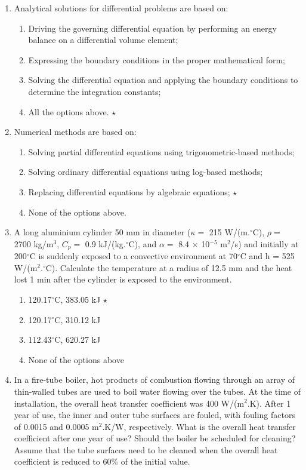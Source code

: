 \documentclass[12pts,a4paper,amsmath,amssymb,floatfix]{article}%
\begin{document}
\begin{enumerate}
%
\item Analytical solutions for differential problems are based on:
\begin{enumerate}
   \item Driving the governing differential equation by performing an energy balance on a differential volume element;
   \item Expressing the boundary conditions in the proper mathematical form;
   \item Solving the differential equation and applying the boundary conditions to determine the integration constants;
   \item All the options above. $\star$
\end{enumerate}
%
\item Numerical methods are based on:
\begin{enumerate}
   \item Solving partial differential equations using trigonometric-based methods;
   \item Solving ordinary differential equations using log-based methods;
   \item Replacing differential equations by algebraic equations; $\star$
   \item None of the options above.
\end{enumerate}
%
\item A long aluminium cylinder 50 mm in diameter ($\kappa=$ 215 W/(m.$^{\circ}$C), $\rho=$ 2700 kg/m$^{3}$, $C_{p}=$ 0.9 kJ/(kg.$^{\circ}$C), and $\alpha=$ 8.4 × 10$^{-5}$ m$^{2}$/s) and initially at 200$^{\circ}$C is suddenly exposed to a convective environment at 70$^{\circ}$C and h = 525 W/(m$^{2}.^{\circ}$C). Calculate the temperature at a radius of 12.5 mm and the heat lost 1 min after the cylinder is exposed to the environment. %
\begin{enumerate}
   \item 120.17$^{\circ}$C, 383.05 kJ $\star$
   \item 120.17$^{\circ}$C, 310.12 kJ
   \item 112.43$^{\circ}$C, 620.27 kJ
   \item None of the options above
\end{enumerate}
%
\item In a fire-tube boiler, hot products of combustion flowing through an array of thin-walled tubes are used to boil water flowing over the tubes. At the time of installation, the overall heat transfer coefficient was 400 W/(m$^{2}$.K). After 1 year of use, the inner and outer tube surfaces are fouled, with fouling factors of 0.0015 and 0.0005 m$^{2}$.K/W, respectively. What is the overall heat transfer coefficient after one year of use? Should the boiler be scheduled for cleaning? Assume that the tube surfaces need to be cleaned when the overall heat coefficient is reduced to 60$\%$ of the initial value. %

\end{enumerate}
\end{document}

